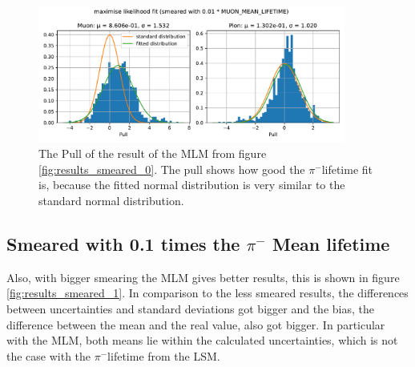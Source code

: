 \documentclass[11pt, a4paper, oneside]{book}
\newcommand\DoublePlotwidth{0.9}
\newcommand{\pion}{$\pi^{-}$}
\begin{document}
\begin{figure}[h]
    \centering
    \includegraphics[width=\DoublePlotwidth\textwidth]{images/4b_pull_0_likelihood.pdf}
    \caption{The Pull of the result of the MLM from figure \ref{fig:results_smeared_0}. The pull shows how good the \pion lifetime fit is, because the fitted normal distribution is very similar to the standard normal distribution.}
    \label{fig:smeared_pull_0}
\end{figure}

\FloatBarrier
\subsection{Smeared with 0.1 times the \texorpdfstring{\pion}{pion} Mean lifetime}

Also, with bigger smearing the MLM gives better results, this is shown in figure \ref{fig:results_smeared_1}. In comparison to the less smeared results, the differences between uncertainties and standard deviations got bigger and the bias, the difference between the mean and the real value, also got bigger. In particular with the MLM, both means lie within the calculated uncertainties, which is not the case with the \pion lifetime from the LSM.
\end{document}
